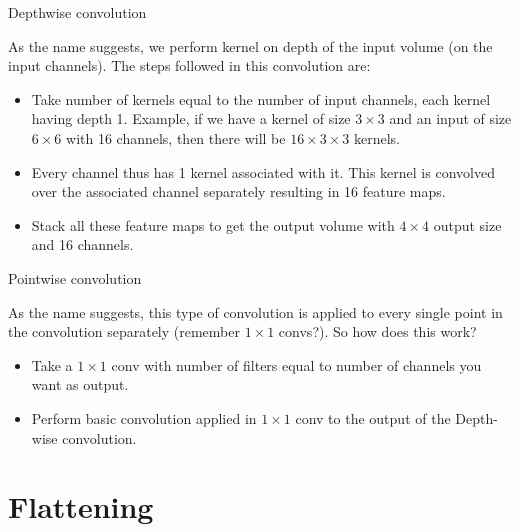 \begin{vbframe}{Depthwise convolution }
 
 As the name suggests, we perform kernel on depth of the input volume (on the input channels). The steps followed in this convolution are:

   \begin{itemize}
     \item Take number of kernels equal to the number of input channels, each kernel having depth 1. Example, if we have a kernel of size $3\times 3$ and an input of size $6\times 6$ with 16 channels, then there will be $16 \times 3 \times 3$ kernels.
     \item Every channel thus has 1 kernel associated with it. This kernel is convolved over the associated channel separately resulting in 16 feature maps.
     \item Stack all these feature maps to get the output volume with $4 \times 4$ output size and 16 channels.
   \end{itemize}

     
\end{vbframe}

\begin{vbframe}{Pointwise convolution }
 
As the name suggests, this type of convolution is applied to every single point in the convolution separately (remember $1\times 1$ convs?). So how does this work?

   \begin{itemize}
     \item Take a $1\times 1$ conv with number of filters equal to number of channels you want as output.
     \item Perform basic convolution applied in $1\times 1$ conv to the output of the Depth-wise convolution.
   \end{itemize}

     
\end{vbframe}

\section{Flattening}

